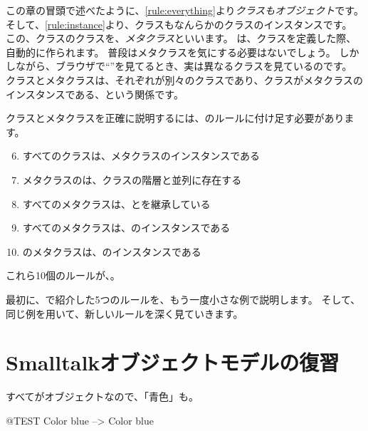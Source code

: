 \documentclass[a4paper,10pt,twoside]{book}
\begin{document}
この章の冒頭で述べたように、\ref{rule:everything}より\emph{クラスもオブジェクト}です。そして、\ref{rule:instance}より、クラスもなんらかのクラスのインスタンスです。
この、クラスのクラスを、\emph{メタクラス}といいます。
は、クラスを定義した際、自動的に作られます。
普段はメタクラスを気にする必要はないでしょう。
しかしながら、ブラウザで``''を見てるとき、実は異なるクラスを見ているのです。
クラスとメタクラスは、それぞれが別々のクラスであり、クラスがメタクラスのインスタンスである、という関係です。

クラスとメタクラスを正確に説明するには、のルールに付け足す必要があります。

\begin{enumerate}[label={\textbf{Rule \arabic{*}}.}, ref={Rule \arabic{*}}, leftmargin=*, widest=10]
\setcounter{enumi}{5}
\item{} 
	すべてのクラスは、メタクラスのインスタンスである

\item{} 
	メタクラスのは、クラスの階層と並列に存在する

\item{} 
	すべてのメタクラスは、とを継承している

\item{} 
	すべてのメタクラスは、のインスタンスである

\item{} 
	のメタクラスは、のインスタンスである

\end{enumerate}

\noindent
これら10個のルールが、。

最初に、で紹介した5つのルールを、もう一度小さな例で説明します。
そして、同じ例を用いて、新しいルールを深く見ていきます。

\section{Smalltalkオブジェクトモデルの復習}

すべてがオブジェクトなので、「青色」も。
\begin{code}{@TEST}
Color blue --> Color blue
\end{code}
\end{document}
